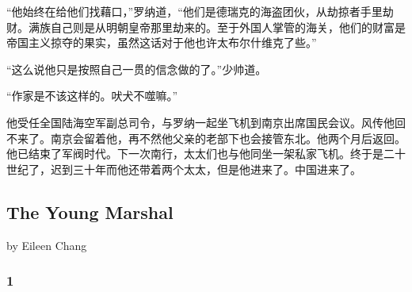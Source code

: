 \par “他始终在给他们找藉口，”罗纳道，“他们是德瑞克的海盗团伙，从劫掠者手里劫财。满族自己则是从明朝皇帝那里劫来的。至于外国人掌管的海关，他们的财富是帝国主义掠夺的果实，虽然这话对于他也许太布尔什维克了些。”
\par “这么说他只是按照自己一贯的信念做的了。”少帅道。
\par “作家是不该这样的。吠犬不噬嘛。”
\par 他受任全国陆海空军副总司令，与罗纳一起坐飞机到南京出席国民会议。风传他回不来了。南京会留着他，再不然他父亲的老部下也会接管东北。他两个月后返回。他已结束了军阀时代。下一次南行，太太们也与他同坐一架私家飞机。终于是二十世纪了，迟到三十年而他还带着两个太太，但是他进来了。中国进来了。








\subsection{The Young Marshal}

\begin{center}
    by Eileen Chang
\end{center}



\subsubsection*{1}


